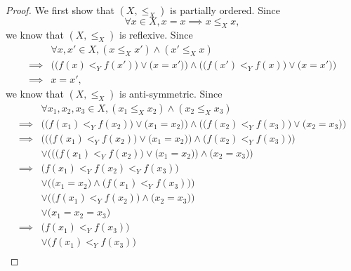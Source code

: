 \begin{proof}
  We first show that \((X, \leq_X)\) is partially ordered.
  Since
  \[
    \forall x \in X, x = x \implies x \leq_X x,
  \]
  we know that \((X, \leq_X)\) is reflexive.
  Since
  \begin{align*}
             & \forall x, x' \in X, (x \leq_X x') \land (x' \leq_X x)                                                                  \\
    \implies & \Big(\big(f(x) <_Y f(x')\big) \lor \big(x = x'\big)\Big) \land \Big(\big(f(x') <_Y f(x)\big) \lor \big(x = x'\big)\Big) \\
    \implies & x = x',
  \end{align*}
  we know that \((X, \leq_X)\) is anti-symmetric.
  Since
  \begin{align*}
             & \forall x_1, x_2, x_3 \in X, (x_1 \leq_X x_2) \land (x_2 \leq_X x_3)                                                                \\
    \implies & \Big(\big(f(x_1) <_Y f(x_2)\big) \lor \big(x_1 = x_2\big)\Big) \land \Big(\big(f(x_2) <_Y f(x_3)\big) \lor \big(x_2 = x_3\big)\Big) \\
    \implies & \bigg(\Big(\big(f(x_1) <_Y f(x_2)\big) \lor \big(x_1 = x_2\big)\Big) \land \big(f(x_2) <_Y f(x_3)\big)\bigg)                        \\
             & \lor \bigg(\Big(\big(f(x_1) <_Y f(x_2)\big) \lor \big(x_1 = x_2\big)\Big) \land \big(x_2 = x_3\big)\bigg)                           \\
    \implies & \big(f(x_1) <_Y f(x_2) <_Y f(x_3)\big)                                                                                              \\
             & \lor \Big(\big(x_1 = x_2\big) \land \big(f(x_1) <_Y f(x_3)\big)\Big)                                                                \\
             & \lor \Big(\big(f(x_1) <_Y f(x_2)\big) \land \big(x_2 = x_3\big)\Big)                                                                \\
             & \lor \big(x_1 = x_2 = x_3\big)                                                                                                      \\
    \implies & \big(f(x_1) <_Y f(x_3)\big)                                                                                                         \\
             & \lor \big(f(x_1) <_Y f(x_3)\big)                                                                                                    \\

\end{align*}
\end{proof}
